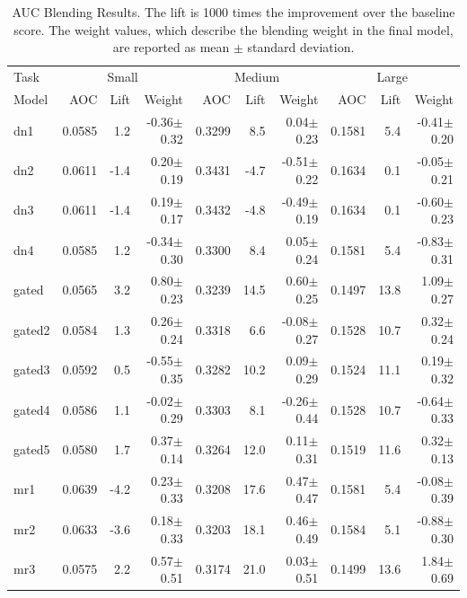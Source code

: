 \documentclass{article}
\begin{document}
\begin{table}[t]
\caption{AUC Blending Results.  The lift is 1000 times the improvement over the baseline score.  The weight values, which describe the blending weight in the final model, are reported as mean $\pm$ standard deviation.}
\label{table:auc-results}
\vskip 0.15in
\begin{center}
\begin{small}
\begin{sc}
\begin{tabular}{l|rr r|rr r|rr r}
\hline
\abovespace\belowspace
Task & \multicolumn{3}{|c}{Small} & \multicolumn{3}{|c}{Medium} & \multicolumn{3}{|c}{Large} \\
Model
& AOC & Lift & Weight 
& AOC & Lift & Weight 
& AOC & Lift & Weight \\
\hline
\abovespace
dn1        & 0.0585 &   1.2 & -0.36$\pm$0.32& 0.3299 &   8.5 &  0.04$\pm$0.23& 0.1581 &   5.4 & -0.41$\pm$0.20 \\ 
dn2        & 0.0611 &  -1.4 &  0.20$\pm$0.19& 0.3431 &  -4.7 & -0.51$\pm$0.22& 0.1634 &   0.1 & -0.05$\pm$0.21 \\ 
dn3        & 0.0611 &  -1.4 &  0.19$\pm$0.17& 0.3432 &  -4.8 & -0.49$\pm$0.19& 0.1634 &   0.1 & -0.60$\pm$0.23 \\ 
dn4        & 0.0585 &   1.2 & -0.34$\pm$0.30& 0.3300 &   8.4 &  0.05$\pm$0.24& 0.1581 &   5.4 & -0.83$\pm$0.31 \\ 
\abovespace
gated      & 0.0565 &   3.2 &  0.80$\pm$0.23& 0.3239 &  14.5 &  0.60$\pm$0.25& 0.1497 &  13.8 &  1.09$\pm$0.27 \\ 
gated2     & 0.0584 &   1.3 &  0.26$\pm$0.24& 0.3318 &   6.6 & -0.08$\pm$0.27& 0.1528 &  10.7 &  0.32$\pm$0.24 \\ 
gated3     & 0.0592 &   0.5 & -0.55$\pm$0.35& 0.3282 &  10.2 &  0.09$\pm$0.29& 0.1524 &  11.1 &  0.19$\pm$0.32 \\ 
gated4     & 0.0586 &   1.1 & -0.02$\pm$0.29& 0.3303 &   8.1 & -0.26$\pm$0.44& 0.1528 &  10.7 & -0.64$\pm$0.33 \\ 
gated5     & 0.0580 &   1.7 &  0.37$\pm$0.14& 0.3264 &  12.0 &  0.11$\pm$0.31& 0.1519 &  11.6 &  0.32$\pm$0.13 \\ 
\abovespace
mr1        & 0.0639 &  -4.2 &  0.23$\pm$0.33& 0.3208 &  17.6 &  0.47$\pm$0.47& 0.1581 &   5.4 & -0.08$\pm$0.39 \\ 
mr2        & 0.0633 &  -3.6 &  0.18$\pm$0.33& 0.3203 &  18.1 &  0.46$\pm$0.49& 0.1584 &   5.1 & -0.88$\pm$0.30 \\ 
mr3        & 0.0575 &   2.2 &  0.57$\pm$0.51& 0.3174 &  21.0 &  0.03$\pm$0.51& 0.1499 &  13.6 &  1.84$\pm$0.69 \\ 

\end{tabular}
\end{sc}
\end{small}
\end{center}
\end{table}
\end{document}
